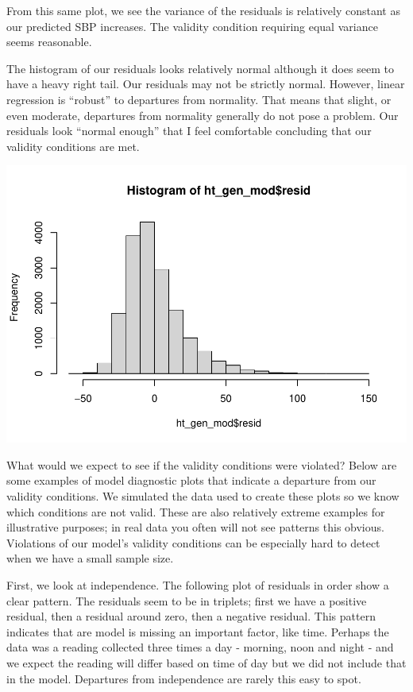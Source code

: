 \documentclass[
]{book}
\newenvironment{Shaded}{\begin{snugshade}}{\end{snugshade}}
\newcommand{\FunctionTok}[1]{\textcolor[rgb]{0.00,0.00,0.00}{#1}}
\newcommand{\NormalTok}[1]{#1}
\newcommand{\SpecialCharTok}[1]{\textcolor[rgb]{0.00,0.00,0.00}{#1}}
\begin{document}
From this same plot, we see the variance of the residuals is relatively constant as our predicted SBP increases. The validity condition requiring equal variance seems reasonable.

The histogram of our residuals looks relatively normal although it does seem to have a heavy right tail. Our residuals may not be strictly normal. However, linear regression is ``robust'' to departures from normality. That means that slight, or even moderate, departures from normality generally do not pose a problem. Our residuals look ``normal enough'' that I feel comfortable concluding that our validity conditions are met.

\begin{Shaded}
\end{Shaded}

\includegraphics{MA206supplement_files/figure-latex/unnamed-chunk-9-1.pdf}

What would we expect to see if the validity conditions were violated? Below are some examples of model diagnostic plots that indicate a departure from our validity conditions. We simulated the data used to create these plots so we know which conditions are not valid. These are also relatively extreme examples for illustrative purposes; in real data you often will not see patterns this obvious. Violations of our model's validity conditions can be especially hard to detect when we have a small sample size.

First, we look at independence. The following plot of residuals in order show a clear pattern. The residuals seem to be in triplets; first we have a positive residual, then a residual around zero, then a negative residual. This pattern indicates that are model is missing an important factor, like time. Perhaps the data was a reading collected three times a day - morning, noon and night - and we expect the reading will differ based on time of day but we did not include that in the model. Departures from independence are rarely this easy to spot.
\end{document}

